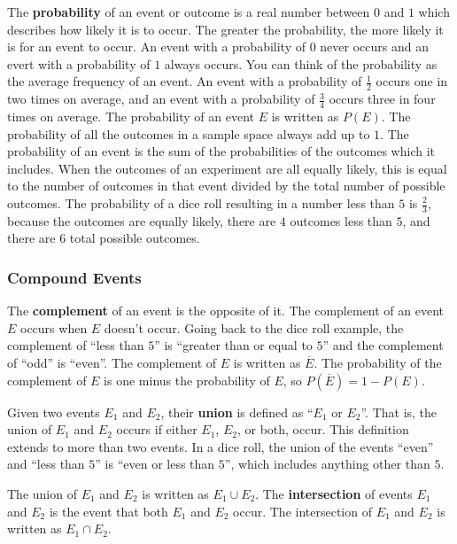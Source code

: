 \documentclass[twocolumn]{article}
\begin{document}
	The \textbf{probability} of an event or outcome is a real number between $0$
	and $1$ which describes how likely it is to occur. The greater the
	probability, the more likely it is for an event to occur. An event with a
	probability of $0$ never occurs and an evert with a probability of $1$
	always occurs. You can think of the probability as the average frequency of
	an event. An event with a probability of $\frac{1}{2}$ occurs one in two
	times on average, and an event with a probability of $\frac{3}{4}$ occurs
	three in four times on average. The probability of an event $E$ is written
	as $P(E)$. The probability of all the outcomes in a sample space always add
	up to $1$. The probability of an event is the sum of the probabilities of
	the outcomes which it includes. When the outcomes of an experiment are all
	equally likely, this is equal to the number of outcomes in that event
	divided by the total number of possible outcomes. The probability of a dice
	roll resulting in a number less than $5$ is $\frac{2}{3}$, because the
	outcomes are equally likely, there are $4$ outcomes less than $5$, and there
	are $6$ total possible outcomes.
	
	\subsubsection*{Compound Events}
	The \textbf{complement} of an event is the opposite of it. The complement of
	an event $E$ occurs when $E$ doesn't occur. Going back to the dice roll
	example, the complement of ``less than $5$'' is ``greater than or equal to
	$5$'' and the complement of ``odd'' is ``even''. The complement of $E$ is
	written as $\overline{E}$. The probability of the complement of $E$ is one
	minus the probability of $E$, so $P(\overline{E}) = 1 - P(E)$.

	Given two events $E_1$ and $E_2$, their \textbf{union} is defined as ``$E_1$
	or $E_2$''. That is, the union of $E_1$ and $E_2$ occurs if either $E_1$,
	$E_2$, or both, occur. This definition extends to more than two events.  In
	a dice roll, the union of the events ``even'' and ``less than $5$'' is
	``even or less than $5$'', which includes anything other than $5$.

	The union of $E_1$ and $E_2$ is written as $E_1 \cup E_2$. The
	\textbf{intersection} of events $E_1$ and $E_2$ is the event that both $E_1$
	and $E_2$ occur. The intersection of $E_1$ and $E_2$ is written as $E_1 \cap
	E_2$.
\end{document}
